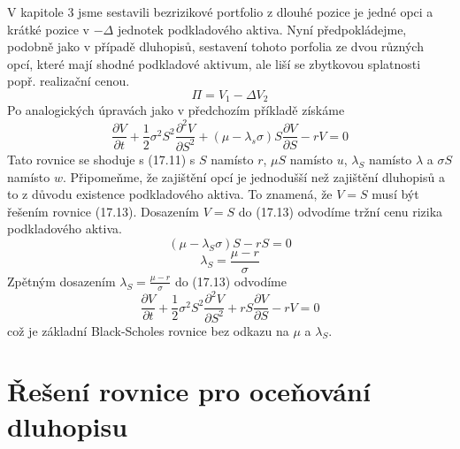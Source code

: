 \documentclass[a4paper]{book}
\begin{document}
V kapitole 3 jsme sestavili bezrizikové portfolio z dlouhé pozice je jedné opci a krátké pozice v $-\Delta$ jednotek podkladového aktiva. Nyní předpokládejme, podobně jako v případě dluhopisů, sestavení tohoto porfolia ze dvou různých opcí, které mají shodné podkladové aktivum, ale liší se zbytkovou splatnosti popř. realizační cenou.
\begin{equation*}
\Pi = V_1 - \Delta V_2
\end{equation*}
Po analogických úpravách jako v předchozím příkladě získáme
\begin{equation}
\frac{\partial V}{\partial t} + \frac{1}{2} \sigma^2 S^2 \frac{\partial^2 V}{\partial S^2} + (\mu - \lambda_s \sigma) S \frac{\partial V}{\partial S} - rV = 0
\end{equation}
Tato rovnice se shoduje s (17.11) s $S$ namísto $r$, $\mu S$ namísto $u$, $\lambda_S$ namísto $\lambda$ a $\sigma S$ namísto $w$. Připomeňme, že zajištění opcí je jednodušší než zajištění dluhopisů a to z důvodu existence podkladového aktiva. To znamená, že $V = S$ musí být řešením rovnice (17.13). Dosazením $V = S$ do (17.13) odvodíme tržní cenu rizika podkladového aktiva.
\begin{equation*}
(\mu - \lambda_S \sigma)S - rS = 0
\end{equation*}
\begin{equation*}
\lambda_S = \frac{\mu - r}{\sigma}
\end{equation*}
Zpětným dosazením $\lambda_S = \frac{\mu - r}{\sigma}$ do (17.13) odvodíme
\begin{equation*}
\frac{\partial V}{\partial t} + \frac{1}{2} \sigma^2 S^2 \frac{\partial^2 V}{\partial S^2} + rS \frac{\partial V}{\partial S} - rV = 0
\end{equation*}
což je základní Black-Scholes rovnice bez odkazu na $\mu$ a $\lambda_S$.

\section{Řešení rovnice pro oceňování dluhopisu}
\end{document}

